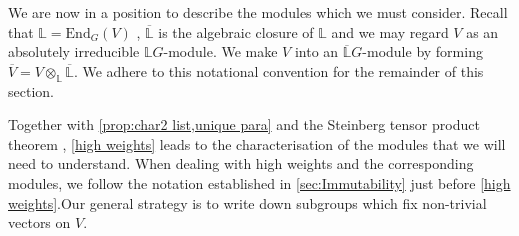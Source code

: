 \documentclass[12pt]{amsart}
\theoremstyle{remark}
\theoremstyle{notation}
\theoremstyle{definition}
\newcommand{\0}{\emptyset}
\begin{document}
We are now in a position to describe the modules which we must consider.  Recall that $\mathbb L=\mathrm{End}_G(V)$ , $\overline {\mathbb L}$ is the algebraic closure of $\mathbb L$ and we may regard $V$ as an absolutely irreducible $\mathbb L G$-module. We make $V$ into an $\overline{\mathbb L}G$-module by forming $\overline V= V\otimes_{\mathbb L}\overline{\mathbb L}$. We adhere to this notational convention for the remainder of this section.


Together with \cref{prop:char2 list,unique para} and the Steinberg tensor product theorem \cite[Corolary 2.8.6]{GLS3}, \cref{high weights} leads to the characterisation of the modules that we will need to understand. When dealing with high weights and the corresponding modules, we follow the notation established in \cref{sec:Immutability} just before \cref{high weights}.Our general strategy is to write down subgroups which fix non-trivial vectors on $V$.
\end{document}
